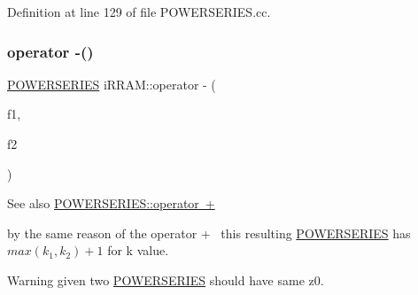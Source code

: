 Definition at line 129 of file P\+O\+W\+E\+R\+S\+E\+R\+I\+E\+S.\+cc.


\begin{DoxyCode}{0}

\end{DoxyCode}
\mbox{\label{namespacei_r_r_a_m_af0eecbd8cf0f60423fe94a4a6c442837}} 
\subsubsection{\texorpdfstring{operator -\/()}{operator -()}}
{\footnotesize\ttfamily \mbox{\hyperlink{classi_r_r_a_m_1_1_p_o_w_e_r_s_e_r_i_e_s}{P\+O\+W\+E\+R\+S\+E\+R\+I\+ES}} i\+R\+R\+A\+M\+::operator -\/ (\begin{DoxyParamCaption}\item[{const \mbox{\hyperlink{classi_r_r_a_m_1_1_p_o_w_e_r_s_e_r_i_e_s}{P\+O\+W\+E\+R\+S\+E\+R\+I\+ES}} \&}]{f1,  }\item[{const \mbox{\hyperlink{classi_r_r_a_m_1_1_p_o_w_e_r_s_e_r_i_e_s}{P\+O\+W\+E\+R\+S\+E\+R\+I\+ES}} \&}]{f2 }\end{DoxyParamCaption})}

\begin{DoxySeeAlso}{See also}
\mbox{\hyperlink{classi_r_r_a_m_1_1_p_o_w_e_r_s_e_r_i_e_s_a3b6840781be086f4d790bc7fb56d15cd}{P\+O\+W\+E\+R\+S\+E\+R\+I\+E\+S\+::operator +}}
\end{DoxySeeAlso}
by the same reason of the operator +~\newline
this resulting \mbox{\hyperlink{classi_r_r_a_m_1_1_p_o_w_e_r_s_e_r_i_e_s}{P\+O\+W\+E\+R\+S\+E\+R\+I\+ES}} has $ max(k_1, k_2)+1 $ for k value.~\newline
\begin{DoxyWarning}{Warning}
given two \mbox{\hyperlink{classi_r_r_a_m_1_1_p_o_w_e_r_s_e_r_i_e_s}{P\+O\+W\+E\+R\+S\+E\+R\+I\+ES}} should have same z0. 
\end{DoxyWarning}


